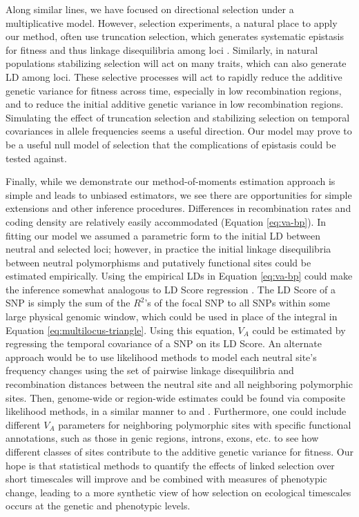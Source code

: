 \documentclass[11pt]{article}
\begin{document}
Along similar lines, we have focused on directional selection under a
multiplicative model. However, selection experiments, a natural place to apply
our method, often use truncation selection, which generates systematic
epistasis for fitness and thus linkage disequilibria among loci
\parencite{Burger2000-an,Walsh2018-bt}. Similarly, in natural populations
stabilizing selection will act on many traits, which can also generate LD among
loci. These selective processes will act to rapidly reduce the additive genetic
variance for fitness across time, especially in low recombination regions, and
to reduce the initial additive genetic variance in low recombination regions.
Simulating the effect of truncation selection and stabilizing selection on
temporal covariances in allele frequencies seems a useful direction. Our model
may prove to be a useful null model of selection that the complications of
epistasis could be tested against. 

Finally, while we demonstrate our method-of-moments estimation approach is
simple and leads to unbiased estimators, we see there are opportunities for
simple extensions and other inference procedures. Differences in recombination
rates and coding density are relatively easily accommodated (Equation
\ref{eq:va-bp}). In fitting our model we assumed a parametric form to the
initial LD between neutral and selected loci; however, in practice the initial
linkage disequilibria between neutral polymorphisms and putatively functional
sites could be estimated empirically. Using the empirical LDs in Equation
\eqref{eq:va-bp} could make the inference somewhat analogous to LD Score
regression \parencite{Bulik-Sullivan2015-ls}. The LD Score of a SNP is simply
the sum of the $R^2$'s of the focal SNP to all SNPs within some large physical
genomic window, which could be used in place of the integral in Equation
\eqref{eq:multilocus-triangle}. Using this equation, $V_A$ could be estimated
by regressing the temporal covariance of a SNP on its LD Score. An alternate
approach would be to use likelihood methods to model each neutral site's
frequency changes using the set of pairwise linkage disequilibria and
recombination distances between the neutral site and all neighboring
polymorphic sites. Then, genome-wide or region-wide estimates could be found
via composite likelihood methods, in a similar manner to
\textcite{McVicker2009-ax} and \textcite{Elyashiv2016-vt}. Furthermore, one
could include different $V_A$ parameters for neighboring polymorphic sites with
specific functional annotations, such as those in genic regions, introns, exons,
etc. to see how different classes of sites contribute to the additive genetic
variance for fitness. Our hope is that statistical methods to quantify the
effects of linked selection over short timescales will improve and be combined
with measures of phenotypic change, leading to a more synthetic view of how
selection on ecological timescales occurs at the genetic and phenotypic levels.
\end{document}
